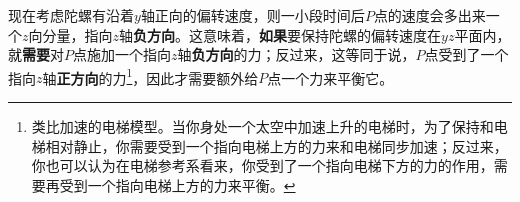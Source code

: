 现在考虑陀螺有沿着$y$轴正向的偏转速度，则一小段时间后$P$点的速度会多出来一个$z$向分量，指向$z$轴\textbf{负方向}。这意味着，\textbf{如果}要保持陀螺的偏转速度在$yz$平面内，就\textbf{需要}对$P$点施加一个指向$z$轴\textbf{负方向}的力；反过来，这等同于说，$P$点受到了一个指向$z$轴\textbf{正方向}的力\footnote{类比加速的电梯模型。当你身处一个太空中加速上升的电梯时，为了保持和电梯相对静止，你需要受到一个指向电梯上方的力来和电梯同步加速；反过来，你也可以认为在电梯参考系看来，你受到了一个指向电梯下方的力的作用，需要再受到一个指向电梯上方的力来平衡。}，因此才需要额外给$P$点一个力来平衡它。

\begin{exercise}{}

\end{exercise}










